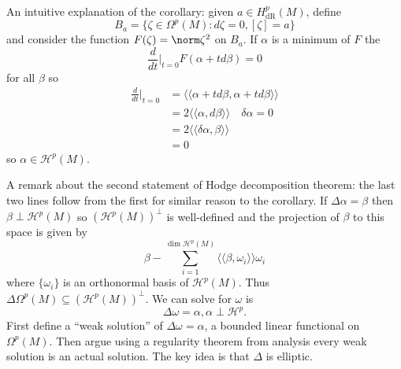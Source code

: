 \documentclass[a4paper]{article}
\begin{document}
An intuitive explanation of the corollary: given \(a \in H_{\text{dR}}^p(M)\), define
\[
  B_a = \{\zeta \in \Omega^p(M): d \zeta = 0, [\zeta] = a\}
\]
and consider the function \(F(\zeta) = \norm \zeta^2\) on \(B_a\). If \(\alpha\) is a minimum of \(F\) the
\[
  \frac{d}{dt}\Big|_{t = 0} F(\alpha + td \beta) = 0
\]
for all \(\beta\) so
\begin{align*}
  \frac{d}{dt} \Big|_{t = 0}
  &= \langle\langle \alpha + t d\beta, \alpha + t d\beta \rangle\rangle \\
  &= 2 \langle\langle \alpha, d\beta \rangle\rangle \quad \delta \alpha = 0 \\
  &= 2 \langle\langle \delta \alpha, \beta\rangle\rangle \\
  &= 0
\end{align*}
so \(\alpha \in \mathcal H^p(M)\).

A remark about the second statement of Hodge decomposition theorem: the last two lines follow from the first for similar reason to the corollary.
If \(\Delta \alpha = \beta\) then \(\beta \perp \mathcal H^p(M)\) so \((\mathcal H^p(M))^\perp\) is well-defined and the projection of \(\beta\) to this space is given by
\[
  \beta - \sum_{i = 1}^{\dim \mathcal H^p(M)} \langle\langle \beta, \omega_i\rangle\rangle \omega_i
\]
where \(\{\omega_i\}\) is an orthonormal basis of \(\mathcal H^p(M)\). Thus \(\Delta \Omega^p(M) \subseteq (\mathcal H^p(M))^\perp\). We can solve for \(\omega\) is
\[
  \Delta \omega = \alpha, \alpha \perp \mathcal H^p.
\]
First define a ``weak solution'' of \(\Delta \omega = \alpha\), a bounded linear functional on \(\Omega^p(M)\). Then argue using a regularity theorem from analysis every weak solution is an actual solution. The key idea is that \(\Delta\) is elliptic.
\end{document}
